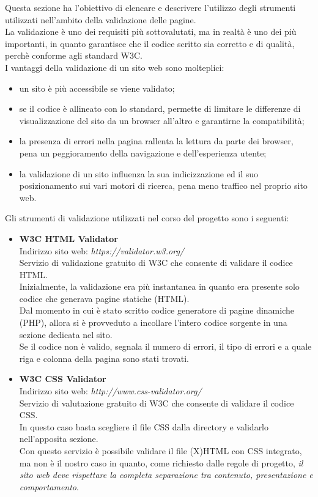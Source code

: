 Questa sezione ha l'obiettivo di elencare e descrivere l'utilizzo degli strumenti utilizzati nell'ambito della validazione delle pagine.\\ 
La validazione è uno dei requisiti più sottovalutati, ma in realtà è uno dei più importanti, in quanto garantisce che il codice scritto sia corretto e di qualità, perchè conforme agli standard W3C.\\
I vantaggi della validazione di un sito web sono molteplici:
\begin{itemize}
	\item un sito è più accessibile se viene validato;
	\item se il codice è allineato con lo standard, permette di limitare le differenze di visualizzazione del sito da un browser all'altro e garantirne la compatibilità;
	\item la presenza di errori nella pagina rallenta la lettura da parte dei browser, pena un peggioramento della navigazione e dell'esperienza utente;
	\item la validazione di un sito influenza la sua indicizzazione ed il suo posizionamento sui vari motori di ricerca, pena meno traffico nel proprio sito web.  
\end{itemize}
Gli strumenti di validazione utilizzati nel corso del progetto sono i seguenti:
\begin{itemize}
	\item \textbf{W3C HTML Validator}\\
	Indirizzo sito web: \emph{https://validator.w3.org/}\\
	Servizio di validazione gratuito di W3C che consente di validare il codice HTML.\\ 
	Inizialmente, la validazione era più instantanea in quanto era presente solo codice che generava pagine statiche (HTML).\\Dal momento in cui è stato scritto codice generatore di pagine dinamiche (PHP), allora si è provveduto a incollare l'intero codice sorgente in una sezione dedicata nel sito.\\
	Se il codice non è valido, segnala il numero di errori, il tipo di errori e a quale riga e colonna della pagina sono stati trovati.
	\item \textbf{W3C CSS Validator}\\
	Indirizzo sito web: \emph{http://www.css-validator.org/}\\
	Servizio di valutazione gratuito di W3C che consente di validare il codice CSS.\\
	In questo caso basta scegliere il file CSS dalla directory e validarlo nell'apposita sezione.\\
	Con questo servizio è possibile validare il file (X)HTML con CSS integrato, ma non è il nostro caso in quanto, come richiesto dalle regole di progetto, \emph{il sito web deve rispettare la completa separazione tra contenuto, presentazione e comportamento}. 
\end{itemize}

 